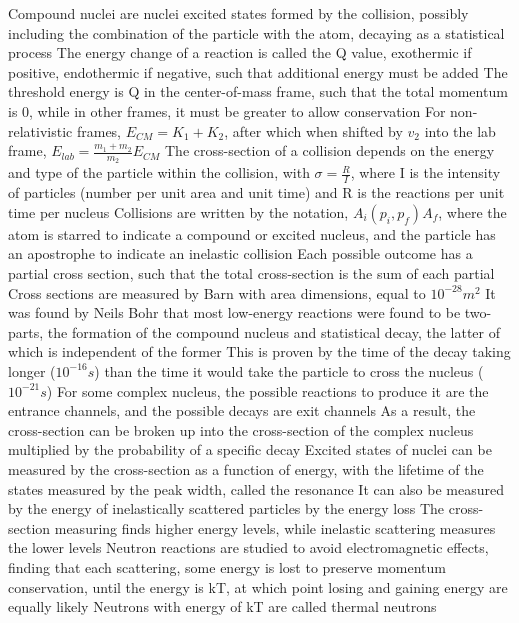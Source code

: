 \documentclass[11 pt, twoside]{article}
\newenvironment{outline*}
{
	\begin{outline}[enumerate]
	}
	{\end{outline}
}
\begin{document}
\begin{outline*}
		\3 Compound nuclei are nuclei excited states formed by the collision, possibly including the combination of the particle with the atom, decaying as a statistical process
	\2 The energy change of a reaction is called the Q value, exothermic if positive, endothermic if negative, such that additional energy must be added
		\3 The threshold energy is Q in the center-of-mass frame, such that the total momentum is 0, while in other frames, it must be greater to allow conservation
		\3 For non-relativistic frames, $E_{CM} = K_1 + K_2$, after which when shifted by $v_2$ into the lab frame, $E_{lab} = \frac{m_1 + m_2}{m_2}E_{CM}$
	\2 The cross-section of a collision depends on the energy and type of the particle within the collision, with $\sigma = \frac{R}{I}$, where I is the intensity of particles (number per unit area and unit time) and R is the reactions per unit time per nucleus
		\3 Collisions are written by the notation, $A_i (p_i, p_f) A_f$, where the atom is starred to indicate a compound or excited nucleus, and the particle has an apostrophe to indicate an inelastic collision
		\3 Each possible outcome has a partial cross section, such that the total cross-section is the sum of each partial
		\3 Cross sections are measured by Barn with area dimensions, equal to $10^{-28} m^2$
	\2 It was found by Neils Bohr that most low-energy reactions were found to be two-parts, the formation of the compound nucleus and statistical decay, the latter of which is independent of the former
		\3 This is proven by the time of the decay taking longer ($10^{-16} s$) than the time it would take the particle to cross the nucleus ($10^{-21} s$)
		\3 For some complex nucleus, the possible reactions to produce it are the entrance channels, and the possible decays are exit channels
		\3 As a result, the cross-section can be broken up into the cross-section of the complex nucleus multiplied by the probability of a specific decay
	\2 Excited states of nuclei can be measured by the cross-section as a function of energy, with the lifetime of the states measured by the peak width, called the resonance
		\3 It can also be measured by the energy of inelastically scattered particles by the energy loss
		\3 The cross-section measuring finds higher energy levels, while inelastic scattering measures the lower levels
	\2 Neutron reactions are studied to avoid electromagnetic effects, finding that each scattering, some energy is lost to preserve momentum conservation, until the energy is kT, at which point losing and gaining energy are equally likely
		\3 Neutrons with energy of kT are called thermal neutrons

\end{outline*}
\end{document}
